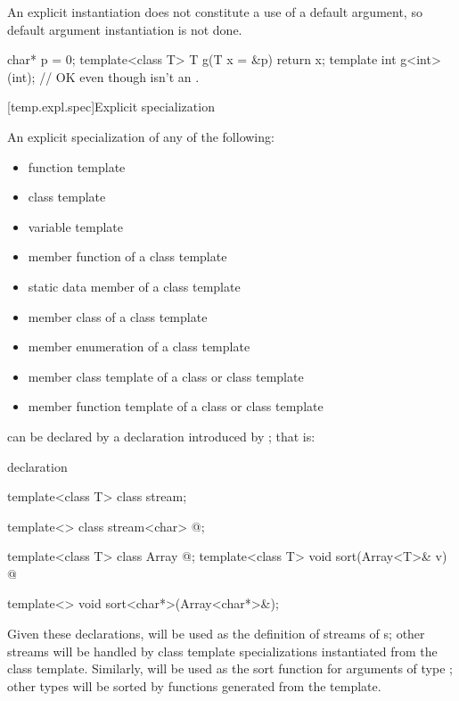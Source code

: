 \pnum
An explicit instantiation does not constitute a use of a default argument,
so default argument instantiation is not done.
\begin{example}

\begin{codeblock}
char* p = 0;
template<class T> T g(T x = &p) { return x; }
template int g<int>(int);       // OK even though  isn't an .
\end{codeblock}
\end{example}

[temp.expl.spec]{Explicit specialization}

\pnum
{}%
An explicit specialization of any of the following:

\begin{itemize}
\item
function template
\item
class template
\item
variable template
\item
member function of a class template
\item
static data member of a class template
\item
member class of a class template
\item
member enumeration of a class template
\item
member class template of a class or class template
\item
member function template of a class or class template
\end{itemize}

can be declared by a declaration introduced by
;
that is:
%

\begin{bnf}
\br
   declaration
\end{bnf}

\begin{example}
\begin{codeblock}
template<class T> class stream;

template<> class stream<char> { @\commentellip@ };

template<class T> class Array { @\commentellip@ };
template<class T> void sort(Array<T>& v) { @\commentellip@ }

template<> void sort<char*>(Array<char*>&);
\end{codeblock}

Given these declarations,
will be used as the definition of streams of
s;
other streams will be handled by class template specializations instantiated
from the class template.
Similarly,
will be used as the sort function for arguments
of type
;
other
types will be sorted by functions generated from the template.
\end{example}

